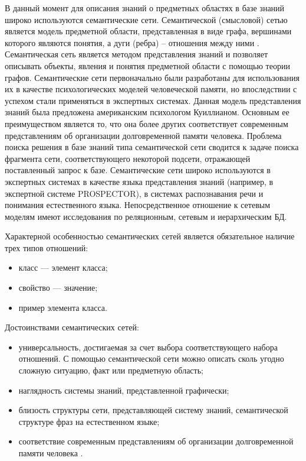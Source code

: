 В данный момент для описания знаний о предметных областях в базе знаний широко используются семантические сети. Семантической (смысловой) сетью является модель предметной области, представленная в виде графа, вершинами которого являются понятия, а дуги (ребра) – отношения между ними \cite{steyvers2005large}. Семантическая сеть является методом представления знаний и позволяет описывать объекты, явления и понятия предметной области с помощью теории графов. Семантические сети первоначально были разработаны для использования их в качестве психологических моделей человеческой памяти, но впоследствии с успехом стали применяться в экспертных системах. Данная модель представления знаний была предложена американским психологом Куиллианом. Основным ее преимуществом является то, что она более других соответствует современным представлениям об организации долговременной памяти человека. Проблема поиска решения в базе знаний типа семантической сети сводится к задаче поиска фрагмента сети, соответствующего некоторой подсети, отражающей поставленный запрос к базе. Семантические сети широко используются в экспертных системах в качестве языка представления знаний (например, в экспертной системе PROSPECTOR), в системах распознавания речи и понимания естественного языка. Непосредственное отношение к сетевым моделям имеют исследования по реляционным, сетевым и иерархическим БД.

Характерной особенностью семантических сетей является обязательное наличие трех типов отношений:

\begin{itemize}
\item класс — элемент класса;
\item свойство — значение; 
\item пример элемента класса.
\end{itemize}

Достоинствами семантических сетей:

\begin{itemize}
\item универсальность, достигаемая за счет выбора соответствующего набора отношений. С помощью семантической сети можно описать сколь угодно сложную ситуацию, факт или предметную область;
\item наглядность системы знаний, представленной графически;
\item близость структуры сети, представляющей систему знаний, семантической структуре фраз на естественном языке;
\item соответствие современным представлениям об организации долговременной памяти человека \cite{gav2001sys}.
\end{itemize}


